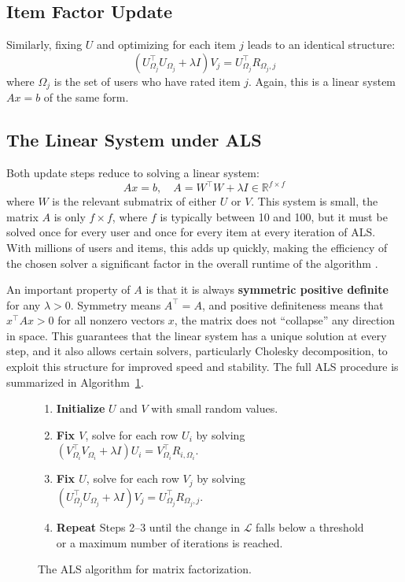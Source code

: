 \documentclass[12pt,a4paper]{report}
\begin{document}
\subsection*{Item Factor Update}

Similarly, fixing \( U \) and optimizing for each item \( j \) leads to an identical structure:
\[
    \left( U_{\Omega_j}^\top U_{\Omega_j} + \lambda I \right) V_j =
    U_{\Omega_j}^\top R_{\Omega_j,j}
\]
where \( \Omega_j \) is the set of users who have rated item \( j \). Again, this is a linear system \( Ax = b \) of the same form.

\subsection*{The Linear System under ALS}

Both update steps reduce to solving a linear system:
\[
    Ax = b, \quad A = W^\top W + \lambda I \in \mathbb{R}^{f \times f}
\]
where \( W \) is the relevant submatrix of either \( U \) or \( V \). This system is small, the matrix \( A \) is only \( f \times f \), where \( f \) is typically between 10 and 100, but it must be solved once for every user and once for every item at every iteration of ALS. With millions of users and items, this adds up quickly, making the efficiency of the chosen solver a significant factor in the overall runtime of the algorithm \parencite{takacs2009scalable}.

An important property of \( A \) is that it is always \textbf{symmetric positive definite} for any \( \lambda > 0 \). Symmetry means \( A^\top = A \), and positive definiteness means that \( x^\top Ax > 0 \) for all nonzero vectors \( x \), the matrix does not ``collapse'' any direction in space. This guarantees that the linear system has a unique solution at every step, and it also allows certain solvers, particularly Cholesky decomposition, to exploit this structure for improved speed and stability. The full ALS procedure is summarized in Algorithm~\ref{alg:als}.

\begin{figure}[H]
\caption{The ALS algorithm for matrix factorization.}
\label{alg:als}
\centering
\begin{minipage}{0.85\textwidth}
\begin{enumerate}[label=\textbf{Step \arabic*.}]
    \item \textbf{Initialize} \( U \) and \( V \) with small random values.
    \item \textbf{Fix \( V \)}, solve for each row \( U_i \) by solving
          \( \left(V_{\Omega_i}^\top V_{\Omega_i} + \lambda I\right) U_i =
          V_{\Omega_i}^\top R_{i,\Omega_i} \).
    \item \textbf{Fix \( U \)}, solve for each row \( V_j \) by solving
          \( \left(U_{\Omega_j}^\top U_{\Omega_j} + \lambda I\right) V_j =
          U_{\Omega_j}^\top R_{\Omega_j,j} \).
    \item \textbf{Repeat} Steps 2--3 until the change in \( \mathcal{L} \)
          falls below a threshold or a maximum number of iterations is reached.
\end{enumerate}
\end{minipage}
\end{figure}
\end{document}
